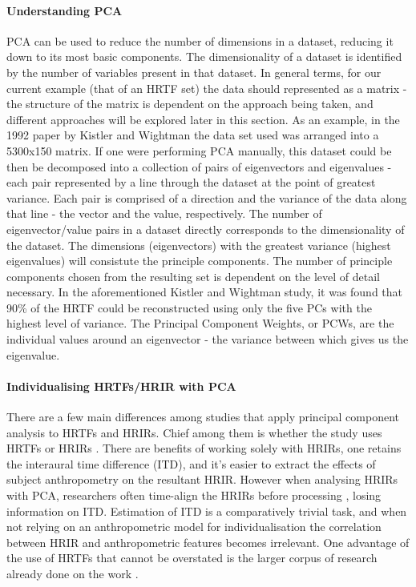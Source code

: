 \paragraph{Understanding PCA}
PCA can be used to reduce the number of dimensions in a dataset, reducing it down to its most basic components. The dimensionality of a dataset is identified by the number of variables present in that dataset. In general terms, for our current example (that of an HRTF set) the data should represented as a matrix - the structure of the matrix is dependent on the approach being taken, and different approaches will be explored later in this section. As an example, in the 1992 paper by Kistler and Wightman \citep{Kistler1992} the data set used was arranged into a 5300x150 matrix. If one were performing PCA manually, this dataset could be then be decomposed into a collection of pairs of eigenvectors and eigenvalues - each pair represented by a line through the dataset at the point of greatest variance. Each pair is comprised of a direction and the variance of the data along that line - the vector and the value, respectively. The number of eigenvector/value pairs in a dataset directly corresponds to the dimensionality of the dataset. The dimensions (eigenvectors) with the greatest variance (highest eigenvalues) will consistute the principle components. The number of principle components chosen from the resulting set is dependent on the level of detail necessary. In the aforementioned Kistler and Wightman study, it was found that 90\% of the HRTF could be reconstructed using only the five PCs with the highest level of variance. The Principal Component Weights, or PCWs, are the individual values around an eigenvector - the variance between which gives us the eigenvalue.


\paragraph{Individualising HRTFs/HRIR with PCA}
There are a few main differences among studies that apply principal component analysis to HRTFs and HRIRs. Chief among them is whether the study uses HRTFs \citep{Holzl2014a} \citep{Gutierrez-Parera2017} or HRIRs \citep{Hwang2008} \citep{Hwang2007} \citep{Fink2012}. There are benefits of working solely with HRIRs, one retains the interaural time difference (ITD), and it's easier to extract the effects of subject anthropometry on the resultant HRIR. However when analysing HRIRs with PCA, researchers often time-align the HRIRs before processing \citep{hwang2010customization}, losing information on ITD. Estimation of ITD is a comparatively trivial task, and when not relying on an anthropometric model for individualisation the correlation between HRIR and anthropometric features becomes irrelevant. One advantage of the use of HRTFs that cannot be overstated is the larger corpus of research already done on the work \citep{Holzl2014a}. 

